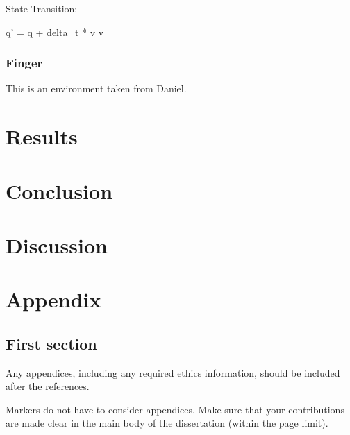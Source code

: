 \documentclass[logo,bsc,singlespacing,parskip]{infthesis}
\begin{document}
State Transition:

q' = q + delta_t * v
v

\subsection*{Finger}

This is an environment taken from Daniel.

\chapter{Results}

\chapter{Conclusion}

\chapter{Discussion}


% 



\appendix

\chapter{Appendix}

\section{First section}

Any appendices, including any required ethics information, should be included
after the references.

Markers do not have to consider appendices. Make sure that your contributions
are made clear in the main body of the dissertation (within the page limit).
\end{document}

